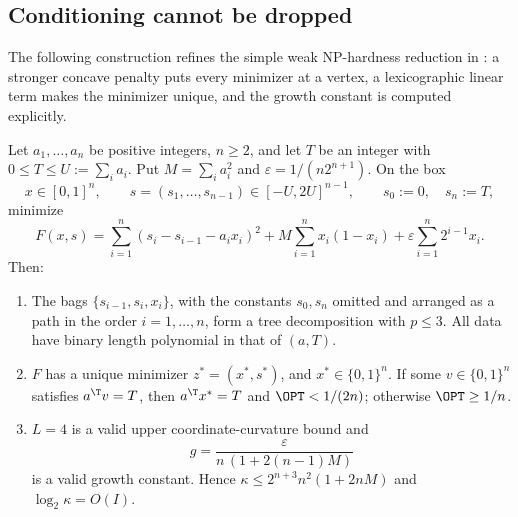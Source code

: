 \subsection{Conditioning cannot be dropped}\label{sec:limits-conditioning}

The following construction refines the simple weak NP-hardness reduction
in \cite[Remark~2]{DelPiaKhajavirad2026}: a stronger concave penalty puts
every minimizer at a vertex, a lexicographic linear term makes the minimizer
unique, and the growth constant is computed explicitly.

\begin{proposition}\label{lim:prop:unique}
Let $a_1,\ldots,a_n$ be positive integers, $n\ge2$, and let $T$ be an
integer with $0\le T\le U:=\sum_ia_i$. Put $M=\sum_ia_i^2$ and
$\varepsilon=1/(n2^{n+1})$. On the box
\[
x\in[0,1]^n,\qquad s=(s_1,\ldots,s_{n-1})\in[-U,2U]^{n-1},
\qquad s_0:=0,\quad s_n:=T,
\]
minimize
\[
F(x,s)=\sum_{i=1}^n(s_i-s_{i-1}-a_ix_i)^2
+M\sum_{i=1}^nx_i(1-x_i)+\varepsilon\sum_{i=1}^n2^{i-1}x_i .
\]
Then:
\begin{enumerate}
\item The bags $\{s_{i-1},s_i,x_i\}$, with the constants $s_0,s_n$ omitted
  and arranged as a path in the order $i=1,\ldots,n$, form a tree
  decomposition with $p\le3$. All data have binary length polynomial in
  that of $(a,T)$.
\item $F$ has a unique minimizer $z^*=(x^*,s^*)$, and $x^*\in\{0,1\}^n$.
  If some $v\in\{0,1\}^n$ satisfies $a^{\T}v=T$, then
  $a^{\T}x^*=T$ and $\OPT<1/(2n)$; otherwise $\OPT\ge1/n$.
\item $L=4$ is a valid upper coordinate-curvature bound and
  \[
  g=\frac{\varepsilon}{n\,(1+2(n-1)M)}
  \]
  is a valid growth constant. Hence
  $\kappa\le2^{n+3}n^2(1+2nM)$ and $\log_2\kappa=O(I)$.
\end{enumerate}
\end{proposition}

